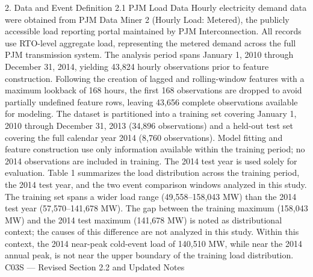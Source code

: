 2. Data and Event Definition
2.1 PJM Load Data
Hourly electricity demand data were obtained from PJM Data Miner 2 (Hourly Load: Metered), the publicly accessible load reporting portal maintained by PJM Interconnection. All records use RTO-level aggregate load, representing the metered demand across the full PJM transmission system. The analysis period spans January 1, 2010 through December 31, 2014, yielding 43,824 hourly observations prior to feature construction. Following the creation of lagged and rolling-window features with a maximum lookback of 168 hours, the first 168 observations are dropped to avoid partially undefined feature rows, leaving 43,656 complete observations available for modeling.
The dataset is partitioned into a training set covering January 1, 2010 through December 31, 2013 (34,896 observations) and a held-out test set covering the full calendar year 2014 (8,760 observations). Model fitting and feature construction use only information available within the training period; no 2014 observations are included in training. The 2014 test year is used solely for evaluation.
Table 1 summarizes the load distribution across the training period, the 2014 test year, and the two event comparison windows analyzed in this study. The training set spans a wider load range (49,558–158,043 MW) than the 2014 test year (57,570–141,678 MW). The gap between the training maximum (158,043 MW) and the 2014 test maximum (141,678 MW) is noted as distributional context; the causes of this difference are not analyzed in this study. Within this context, the 2014 near-peak cold-event load of 140,510 MW, while near the 2014 annual peak, is not near the upper boundary of the training load distribution.
C03S — Revised Section 2.2 and Updated Notes

